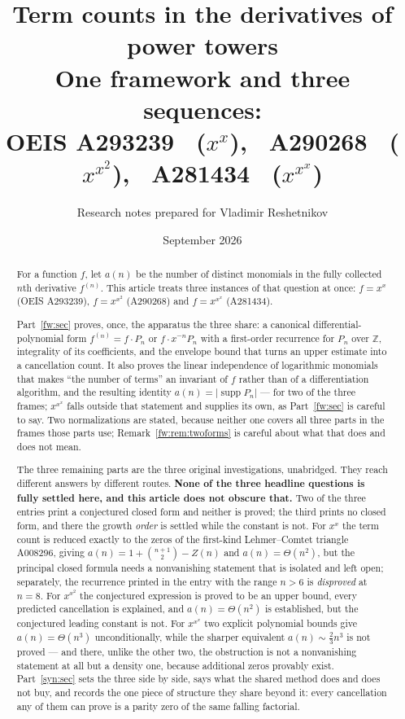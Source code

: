 \documentclass[11pt,a4paper]{article}
\title{\textbf{Term counts in the derivatives of power towers}\\[5pt]
\large One framework and three sequences:\\
OEIS A293239 \ ($x^x$), \ A290268 \ ($x^{x^2}$), \ A281434 \ ($x^{x^x}$)}
\author{Research notes prepared for Vladimir Reshetnikov}
\date{September 2026}
\numberwithin{equation}{section}
\theoremstyle{definition}
\theoremstyle{remark}
\theoremstyle{plain}
\DeclareMathOperator{\supp}{supp}
\newcommand{\Z}{\mathbb Z}
\begin{document}
\maketitle

\begin{abstract}
For a function $f$, let $a(n)$ be the number of distinct monomials in the fully
collected $n$th derivative $f^{(n)}$.  This article treats three instances of
that question at once: $f=x^x$ (OEIS A293239), $f=x^{x^2}$ (A290268) and
$f=x^{x^x}$ (A281434).

Part~\ref{fw:sec} proves, once, the apparatus the three share: a canonical
differential-polynomial form $f^{(n)}=f\cdot P_n$ or $f\cdot x^{-n}P_n$ with a
first-order recurrence for $P_n$ over $\Z$, integrality of its coefficients, and
the envelope bound that turns an upper estimate into a cancellation count.  It
also proves the linear independence of logarithmic monomials that makes ``the
number of terms'' an invariant of $f$ rather than of a differentiation
algorithm, and the resulting identity $a(n)=|\supp P_n|$ --- for two of the
three frames; $x^{x^x}$ falls outside that statement and supplies its own, as
Part~\ref{fw:sec} is careful to say.  Two normalizations are stated, because neither one covers
all three parts in the frames those parts use; Remark~\ref{fw:rem:twoforms} is
careful about what that does and does not mean.

The three remaining parts are the three original investigations, unabridged.
They reach different answers by different routes.  \textbf{None of the three
headline questions is fully settled here, and this article does not obscure
that.}  Two of the three entries print a conjectured closed form and neither is
proved; the third prints no closed form, and there the growth \emph{order} is
settled while the constant is not.  For $x^x$ the
term count is reduced exactly to the zeros of the first-kind Lehmer--Comtet
triangle A008296, giving $a(n)=1+\binom{n+1}{2}-Z(n)$ and $a(n)=\Theta(n^2)$,
but the principal closed formula needs a nonvanishing statement that is isolated
and left open; separately, the recurrence printed in the entry with the range
$n>6$ is \emph{disproved} at $n=8$.  For $x^{x^2}$ the conjectured expression is
proved to be an upper bound, every predicted cancellation is explained, and
$a(n)=\Theta(n^2)$ is established, but the conjectured leading constant is not.
For $x^{x^x}$ two explicit polynomial bounds give $a(n)=\Theta(n^3)$
unconditionally, while the sharper equivalent $a(n)\sim\tfrac23n^3$ is not
proved --- and there, unlike the other two, the obstruction is not a
nonvanishing statement at all but a density one, because additional zeros
provably exist.  Part~\ref{syn:sec} sets the three side by side, says what the
shared method does and does not buy, and records the one piece of structure they
share beyond it: every cancellation any of them can prove is a parity zero of
the same falling factorial.


\end{abstract}
\end{document}
